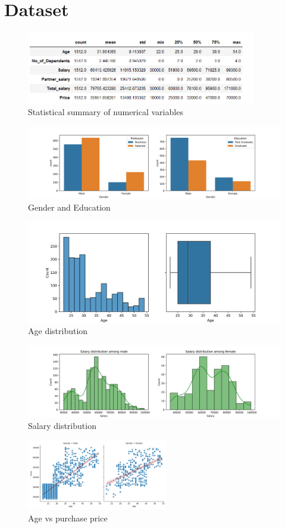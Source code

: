 \documentclass[12pt,a4paper]{style}
\begin{document}
	\section{Dataset}
	\begin{figure}[h]
		\centering
		\includegraphics[width=10cm]{stat_summary.png}
		\caption{Statistical summary of numerical variables}
	\end{figure}
	\begin{figure}[h]
		\centering
		\includegraphics[width=13cm]{about_buyers.png}
		\caption{Gender and Education}
	\end{figure}
	\begin{figure}[h]
		\centering
		\includegraphics[width=12cm]{Age_dist.png}
		\caption{Age distribution}
	\end{figure}
	\begin{figure}[h]
		\centering
		\includegraphics[width=13cm]{salary_gender_dist.png}
		\caption{Salary distribution}
	\end{figure}
	\begin{figure}
		\includegraphics[width=0.55\textwidth]{Age_vs_price.png}
		\caption{Age vs purchase price}
	\end{figure}
\end{document}
